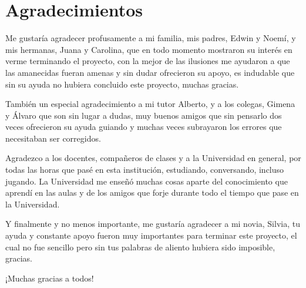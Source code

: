 \chapter*{Agradecimientos} %


%

Me gustaría agradecer profusamente a mi familia, mis padres, Edwin y Noemí, y mis hermanas, Juana y Carolina, que en todo momento mostraron su interés en verme terminando el proyecto, con la mejor de las ilusiones me ayudaron a que las amanecidas fueran amenas y sin dudar ofrecieron su apoyo, es indudable que sin su ayuda no hubiera concluido este proyecto, muchas gracias.

También un especial agradecimiento a mi tutor Alberto, y a los colegas, Gimena y Álvaro que son sin lugar a dudas, muy buenos amigos que sin pensarlo dos veces ofrecieron su ayuda guiando y muchas veces subrayaron los errores que necesitaban ser corregidos.

Agradezco a los docentes, compañeros de clases y a la Universidad en general, por todas las horas que pasé en esta institución, estudiando, conversando, incluso jugando. La Universidad me enseñó muchas cosas aparte del conocimiento que aprendí en las aulas y de los amigos que forje durante todo el tiempo que pase en la Universidad.

Y finalmente y no menos importante, me gustaría agradecer a mi novia, Silvia, tu ayuda y constante apoyo fueron muy importantes para terminar este proyecto, el cual no fue sencillo pero sin tus palabras de aliento hubiera sido imposible, gracias.


¡Muchas gracias a todos!
